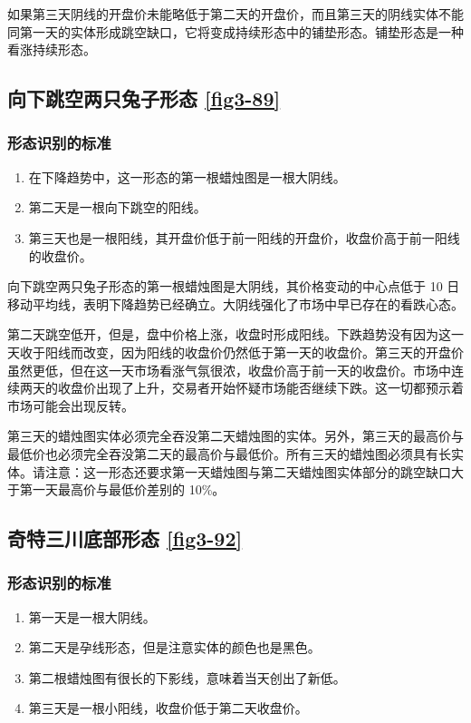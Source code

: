 如果第三天阴线的开盘价未能略低于第二天的开盘价，而且第三天的阴线实体不能同第一天的实体形成跳空缺口，它将变成持续形态中的铺垫形态。铺垫形态是一种看涨持续形态。

\subsection{向下跳空两只兔子形态 \autoref{fig3-89}}
\subsubsection*{形态识别的标准}
\begin{enumerate}
    \item 在下降趋势中，这一形态的第一根蜡烛图是一根大阴线。
    \item 第二天是一根向下跳空的阳线。
    \item 第三天也是一根阳线，其开盘价低于前一阳线的开盘价，收盘价高于前一阳线的收盘价。
\end{enumerate}

向下跳空两只兔子形态的第一根蜡烛图是大阴线，其价格变动的中心点低于 10 日移动平均线，表明下降趋势已经确立。大阴线强化了市场中早已存在的看跌心态。

第二天跳空低开，但是，盘中价格上涨，收盘时形成阳线。下跌趋势没有因为这一天收于阳线而改变，因为阳线的收盘价仍然低于第一天的收盘价。第三天的开盘价虽然更低，但在这一天市场看涨气氛很浓，收盘价高于前一天的收盘价。市场中连续两天的收盘价出现了上升，交易者开始怀疑市场能否继续下跌。这一切都预示着市场可能会出现反转。

第三天的蜡烛图实体必须完全吞没第二天蜡烛图的实体。另外，第三天的最高价与最低价也必须完全吞没第二天的最高价与最低价。所有三天的蜡烛图必须具有长实体。请注意：这一形态还要求第一天蜡烛图与第二天蜡烛图实体部分的跳空缺口大于第一天最高价与最低价差别的 10\%。
\subsection{奇特三川底部形态 \autoref{fig3-92}}
\subsubsection*{形态识别的标准}
\begin{enumerate}
    \item 第一天是一根大阴线。
    \item 第二天是孕线形态，但是注意实体的颜色也是黑色。
    \item 第二根蜡烛图有很长的下影线，意味着当天创出了新低。
    \item 第三天是一根小阳线，收盘价低于第二天收盘价。
\end{enumerate}

